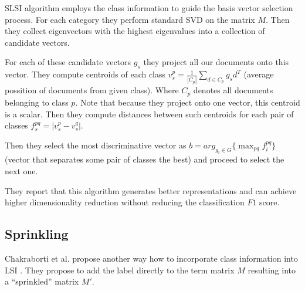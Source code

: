         SLSI algorithm employs the class information to guide the basis vector selection process. 
        For each category they perform standard SVD on the matrix $M$.
        Then they collect eigenvectors with the highest eigenvalues into a collection of candidate vectors.
        
        For each of these candidate vectors $g_s$ they project all our documents onto this vector.
        They compute centroids of each class $v_s^p = \frac{1}{|C_p|}\sum_{d\in C_p} g_s d^T$ (average possition of documents from given class). 
        Where $C_p$ denotes all documents belonging to class $p$.
        Note that because they project onto one vector, this centroid is a scalar. 
        Then they compute distances between such centroids for each pair of classes $f_s^{pq} = |v_s^p - v_s^q|$.
        
        Then they select the most discriminative vector as $b=arg_{g_i \in G} \{\max_{p q} f_i^{p q} \}$ (vector that separates some pair of classes the best) and proceed to select the next one.
        
        They report that this algorithm generates better representations and can achieve higher dimensionality reduction without reducing the classification $F1$ score.
        
    \subsection{Sprinkling}
        Chakraborti et al. propose another way how to incorporate class information into LSI \cite{chakraborti2006sprinkling}\cite{chakraborti2007supervised}.
        They propose to add the label directly to the term matrix $M$ resulting into a ``sprinkled'' matrix $M'$.

